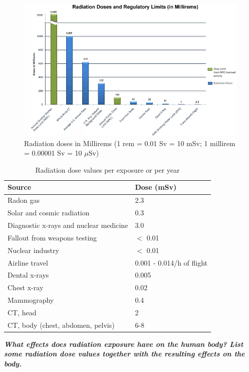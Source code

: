 \begin{figure}[t!]
	\includegraphics[scale=0.5]{img/rem-chart}
	\caption{Radiation doses in Millirems (1 rem = 0.01 Sv = 10 mSv; 1 millirem = 0.00001 Sv = 10 $\mu$Sv)}
	\label{fig:rem-chart}
\end{figure}

\begin{table}[h!]
\centering
	\begin{tabular}{|l|l|}
		\hline
		\rowcolor[gray]{0.8}
		Source & Dose (mSv)
		\\ \hline
		Radon gas & 2.3
		\\ \hline
		Solar and cosmic radiation & 0.3
		\\ \hline
		Diagnostic x-rays and nuclear medicine & 3.0
		\\ \hline
		Fallout from weapons testing & $<$ 0.01
		\\ \hline
		Nuclear industry & $<$ 0.01
		\\ \hline
		Airline travel & 0.001 - 0.014/h of flight
		\\ \hline
		Dental x-rays & 0.005
		\\ \hline
		Chest x-ray & 0.02
		\\ \hline
		Mammography & 0.4
		\\ \hline
		CT, head & 2
		\\ \hline
		CT, body (chest, abdomen, pelvis) & 6-8
		\\ \hline
	\end{tabular}
\caption{Radiation dose values per exposure or per year}
\label{tbl:doses}
\end{table}

\textbf{\emph{What effects does radiation exposure have on the human body? List some radiation dose values together with the resulting effects on the body.}}

